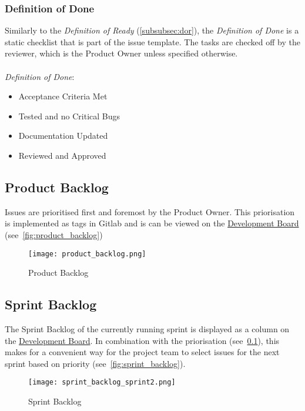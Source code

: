 \subsubsection{Definition of Done}\label{subsubsec:dod}
Similarly to the \textit{Definition of Ready} (\ref{subsubsec:dor}),  the \textit{Definition of Done} is a static checklist that is part of
the issue template. The tasks are checked off by the reviewer, which is the Product Owner unless specified otherwise. \\ \\
\textit{Definition of Done}:
\begin{itemize}
    \item Acceptance Criteria Met
    \item Tested and no Critical Bugs
    \item Documentation Updated
    \item Reviewed and Approved
\end{itemize}
\subsection{Product Backlog}\label{subsec:product_backlog}
Issues are prioritised first and foremost by the Product Owner. This priorisation is implemented as tags in Gitlab and is can be viewed
on the \href{https://gitlab.ti.bfh.ch/decibel-threshold-event-displayer/decibel-threshold-event-displayer/-/boards/2832}{Development Board} (see\ \autoref{fig:product_backlog})
\begin{figure}[H]
    \centering
    \texttt{[image: product\_backlog.png]}
    \caption{Product Backlog}\label{fig:product_backlog}
\end{figure}
\subsection{Sprint Backlog}
The Sprint Backlog of the currently running sprint is displayed as a column on the \href{https://gitlab.ti.bfh.ch/decibel-threshold-event-displayer/decibel-threshold-event-displayer/-/boards/2832}{Development Board}. In combination with the priorisation (see\ \ref{subsec:product_backlog}),
this makes for a convenient way for the project team to select issues for the next sprint based on priority (see\ \autoref{fig:sprint_backlog}).
\begin{figure}[H]
    \centering
    \texttt{[image: sprint\_backlog\_sprint2.png]}
    \caption{Sprint Backlog}\label{fig:sprint_backlog}
\end{figure}
